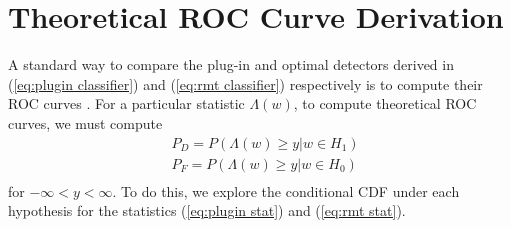 \section{Theoretical ROC Curve Derivation}\label{sec:roc}
A standard way to compare the plug-in and optimal detectors derived in (\ref{eq:plugin classifier}) and (\ref{eq:rmt classifier}) respectively is to compute their ROC curves \cite{fawcett2006introduction}. For a particular statistic $\Lambda(w)$, to compute theoretical ROC curves, we must compute
\begin{equation}\label{eq:target cdf}
\begin{aligned}
&P_D = P(\Lambda(w) \geq y| w\in H_1)\\
&P_F = P(\Lambda(w) \geq y| w\in H_0)\\
\end{aligned}
\end{equation}
for $-\infty<y<\infty$. To do this, we explore the conditional CDF under each hypothesis for the statistics (\ref{eq:plugin stat}) and (\ref{eq:rmt stat}).

